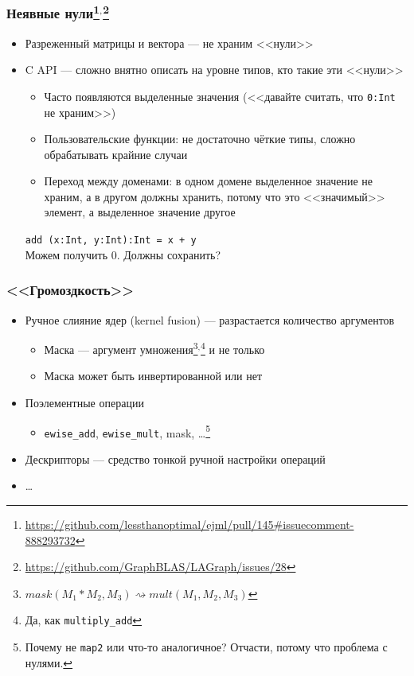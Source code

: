 \documentclass[xcolor=table,aspectratio=169]{beamer}
\begin{document}
\begin{frame}[fragile]
  \frametitle{Неявные нули\footnote{\url{https://github.com/lessthanoptimal/ejml/pull/145\#issuecomment-888293732}}$^{,}$\footnote{\url{https://github.com/GraphBLAS/LAGraph/issues/28}}}
  \begin{itemize}
    \item Разреженный матрицы и вектора --- не храним <<нули>>
    \item C API --- сложно внятно описать на уровне типов, кто такие эти <<нули>>
    \begin{itemize}
      \item Часто появляются выделенные значения (<<давайте считать, что \texttt{0:Int} не храним>>)
      \item Пользовательские функции: не достаточно чёткие типы, сложно обрабатывать крайние случаи
      \item Переход между доменами: в одном домене выделенное значение не храним, а в другом должны хранить, потому что это <<значимый>> элемент, а выделенное значение другое
    \end{itemize}    
    \vfill
    \texttt{add (x:Int, y:Int):Int = x + y}
    \\ Можем получить 0. Должны сохранить?
  \end{itemize}
\end{frame}

\begin{frame}[fragile]
  \frametitle{<<Громоздкость>>}
  \begin{itemize}
    \item Ручное слияние ядер (kernel fusion) --- разрастается количество аргументов
    \begin{itemize}
      \item Маска --- аргумент умножения\footnote{$mask(M_1 * M_2, M_3) 	\rightsquigarrow mult(M_1,M_2,M_3)$}$^{,}$\footnote{Да, как \texttt{multiply\_add}} и не только
      \item Маска может быть инвертированной или нет      
    \end{itemize}
    \item Поэлементные операции
    \begin{itemize}
      \item \texttt{ewise\_add}, \texttt{ewise\_mult}, mask, \ldots\footnote{Почему не \texttt{map2} или что-то аналогичное? Отчасти, потому что проблема с нулями.}
    \end{itemize}
    \item Дескрипторы --- средство тонкой ручной настройки операций
    \item \ldots
  \end{itemize}
\end{frame}
\end{document}

